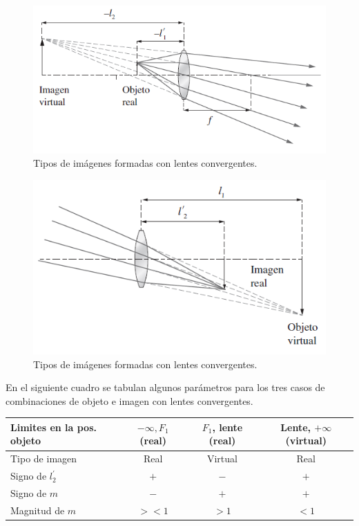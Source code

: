 \documentclass[14pt]{extarticle}
\begin{document}
\begin{figure}[H]
    \centering
    \includegraphics[scale=0.8]{Imagenes/Lentes_07b.png}
    \caption{Tipos de imágenes formadas con lentes convergentes.}
    \label{fig:figura_II_06b}
\end{figure}
\begin{figure}[H]
    \centering
    \includegraphics[scale=0.8]{Imagenes/Lentes_07c.png}
    \caption{Tipos de imágenes formadas con lentes convergentes.}
    \label{fig:figura_II_06c}
\end{figure}
En el siguiente cuadro se tabulan algunos parámetros para los tres casos de combinaciones de objeto e imagen con lentes convergentes.
\begin{table}[H]
    \centering
    \begin{tabular}{l c c c}
        Limites en la pos. objeto & $-\infty, F_{1}$ (real) & $F_{1}$, lente (real) & Lente, $+\infty$ (virtual) \\ \hline
        Tipo de imagen & Real & Virtual & Real \\
        Signo de $l_{2}^{\prime}$ & $+$ & $-$ & $+$ \\
        Signo de $m$ & $-$ & $+$ & $+$ \\
        Magnitud de $m$ & $>< 1$ & $> 1$ & $< 1$        
    \end{tabular}
\end{table}
\end{document}
